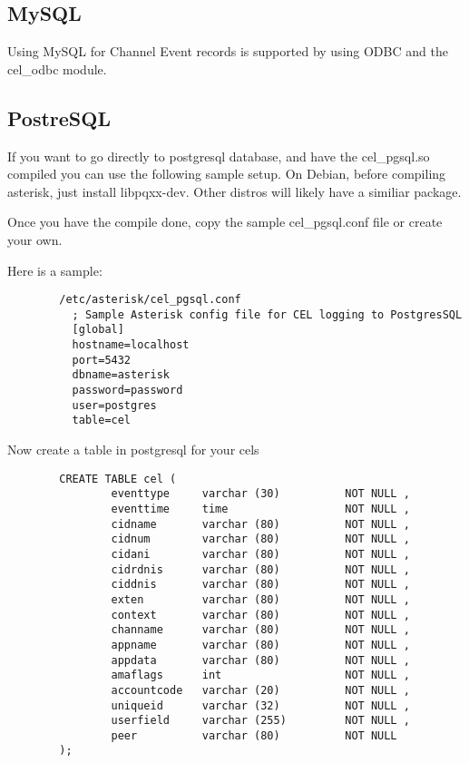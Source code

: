 \subsection{MySQL}

Using MySQL for Channel Event records is supported by using ODBC and the cel_odbc module.

\subsection{PostreSQL}
        If you want to go directly to postgresql database, and have the cel_pgsql.so
        compiled you can use the following sample setup.
        On Debian, before compiling asterisk, just install libpqxx-dev.
        Other distros will likely have a similiar package.

        Once you have the compile done,
        copy the sample cel_pgsql.conf file or create your own.

        Here is a sample:
\begin{verbatim}
        /etc/asterisk/cel_pgsql.conf
          ; Sample Asterisk config file for CEL logging to PostgresSQL
          [global]
          hostname=localhost
          port=5432
          dbname=asterisk
          password=password
          user=postgres
          table=cel
\end{verbatim}
        Now create a table in postgresql for your cels

\begin{verbatim}
        CREATE TABLE cel (
                eventtype     varchar (30)          NOT NULL ,
                eventtime     time                  NOT NULL ,
                cidname       varchar (80)          NOT NULL ,
                cidnum        varchar (80)          NOT NULL ,
                cidani        varchar (80)          NOT NULL ,
                cidrdnis      varchar (80)          NOT NULL ,
                ciddnis       varchar (80)          NOT NULL ,
                exten         varchar (80)          NOT NULL ,
                context       varchar (80)          NOT NULL ,
                channame      varchar (80)          NOT NULL ,
                appname       varchar (80)          NOT NULL ,
                appdata       varchar (80)          NOT NULL ,
                amaflags      int                   NOT NULL ,
                accountcode   varchar (20)          NOT NULL ,
                uniqueid      varchar (32)          NOT NULL ,
                userfield     varchar (255)         NOT NULL ,
                peer          varchar (80)          NOT NULL
        );
\end{verbatim}

